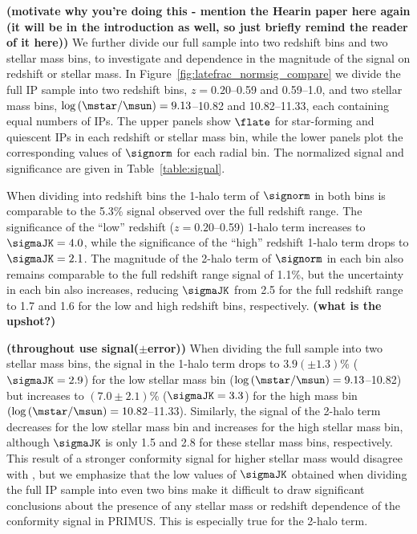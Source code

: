 {\bf(motivate why you're doing this - mention the Hearin paper here again (it will be in the introduction as well, so just briefly remind the reader of it here))}
We further divide our full sample into two redshift bins and two stellar mass bins, 
to investigate and dependence in the magnitude of the signal on redshift or 
stellar mass.
In Figure~\ref{fig:latefrac_normsig_compare} we divide the full IP sample into two redshift bins, {$z=0.20$--0.59} and 0.59--1.0, and two stellar mass bins, 
{$\log\,(\mstar/\msun)=9.13$--10.82} and 10.82--11.33, each containing equal numbers of IPs.
The upper panels show $\flate$ for star-forming and quiescent IPs in each redshift or stellar mass bin, while the lower panels plot the corresponding values of
$\signorm$ for each radial bin. The normalized signal and significance are given in 
Table~\ref{table:signal}.

When dividing into redshift bins the 1-halo term of $\signorm$ in both bins is comparable to the 5.3\% signal observed over the full redshift range.
The significance of the ``low'' redshift {($z=0.20$--0.59)} 1-halo term increases to 
{$\sigmaJK=4.0$}, while the significance of the ``high'' redshift 1-halo term drops to
{$\sigmaJK=2.1$}.
The magnitude of the 2-halo term of $\signorm$ in each bin also remains comparable to the full redshift range signal of 1.1\%, but the uncertainty in each bin also increases,
reducing $\sigmaJK$ from 2.5 for the full redshift range to 1.7 and 1.6 for the low and high redshift bins, respectively.
{\bf(what is the upshot?)}

{\bf(throughout use signal($\pm$error))}
When dividing the full sample into two stellar mass bins, the signal in the 
1-halo term drops to {$3.9(\pm1.3)$\%} ($\sigmaJK=2.9$) for the low stellar mass bin ({$\log\,(\mstar/\msun)=9.13$--10.82}) but
increases to {$(7.0\pm2.1)$\%} ($\sigmaJK=3.3$) for the high mass bin {$(\log\,(\mstar/\msun)=10.82$--11.33)}.
Similarly, the signal of the 2-halo term decreases for the low stellar mass bin 
and increases for the high stellar mass bin, although $\sigmaJK$ is only 1.5 
and 2.8 for these stellar mass bins, respectively.  This result of a 
stronger conformity signal for higher stellar mass would disagree with 
, but we emphasize that the low values of 
$\sigmaJK$ obtained when dividing the full IP sample into even two bins 
make it difficult to draw significant conclusions about the presence of any 
stellar mass or redshift
dependence of the conformity signal in PRIMUS.  This is especially true 
for the 2-halo term.




